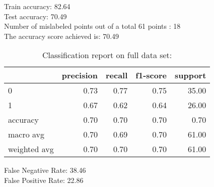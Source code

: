 Train accuracy: 82.64%
\\Test accuracy: 70.49%
\\Number of mislabeled points out of a total 61 points : 18
\\The accuracy score achieved is: 70.49 %
\begin{table}[H]
\caption{Classification report on full data set:}
\begin{center}
\begin{tabular}{lrrrr}
\toprule
{} &  precision &  recall &  f1-score &  support \\
\midrule
0            &       0.73 &    0.77 &      0.75 &    35.00 \\
1            &       0.67 &    0.62 &      0.64 &    26.00 \\
accuracy     &       0.70 &    0.70 &      0.70 &     0.70 \\
macro avg    &       0.70 &    0.69 &      0.70 &    61.00 \\
weighted avg &       0.70 &    0.70 &      0.70 &    61.00 \\
\bottomrule
\end{tabular}

\label{log_reg_class}
\end{center}
\end{table}
\noindent
False Negative Rate: 38.46
\\False Positive Rate: 22.86
